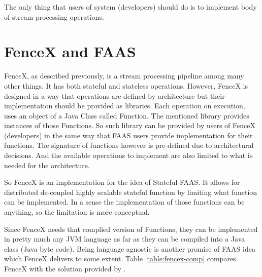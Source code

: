 \documentclass[a4]{report}
\begin{document}
    The only thing that users of system (developers) should do is to implement body of stream processing operations.


    \section{FenceX and FAAS}
    FenceX, as described previously, is a stream processing pipeline among many other things.
    It has both stateful and stateless operations.
    However, FenceX is designed in a way that operations are defined by architecture but their implementation should
    be provided as libraries.
    Each operation on execution, uses an object of a Java Class called Function.
    The mentioned library provides instances of those Functions.
    So such library can be provided by users of FenceX (developers) in the same way that FAAS users provide
    implementation for their functions.
    The signature of functions however is pre-defined due to architectural decisions.
    And the available operations to implement are also limited to what is needed for the architecture.

    So FenceX is an implementation for the idea of Stateful FAAS.
    It allows for distributed de-coupled highly scalable stateful function by limiting what function can be implemented.
    In a sense the implementation of those functions can be anything, so the limitation is more conceptual.

    Since FenceX needs that complied version of Functions, they can be implemented in pretty much any JVM language as
    far as they can be compiled into a Java class (Java byte code).
    Being language agnostic is another promise of FAAS idea which FenceX delivers to some extent.
    Table \ref{table:fencex-comp} compares FenceX with the solution provided by \cite{Functions-as-a-Service-2020}.
\end{document}

